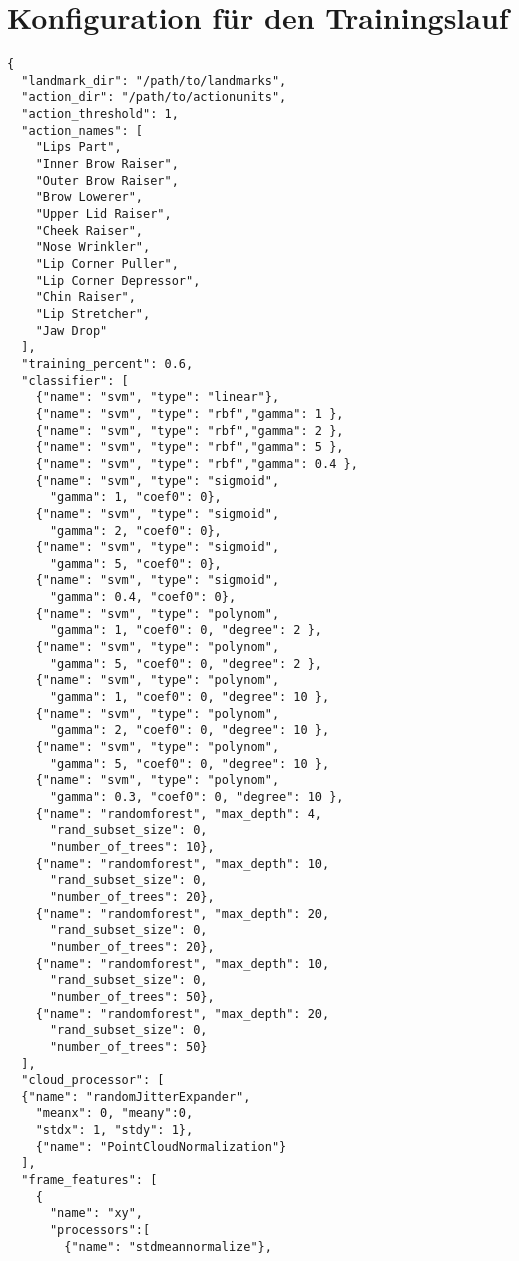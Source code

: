 \section{Konfiguration für den Trainingslauf}\label{Anhang.config}
\begin{multicols}{2}
\begin{verbatim}
{
  "landmark_dir": "/path/to/landmarks",
  "action_dir": "/path/to/actionunits",
  "action_threshold": 1,
  "action_names": [
    "Lips Part",
    "Inner Brow Raiser",
    "Outer Brow Raiser",
    "Brow Lowerer",
    "Upper Lid Raiser",
    "Cheek Raiser",
    "Nose Wrinkler",
    "Lip Corner Puller",
    "Lip Corner Depressor",
    "Chin Raiser",
    "Lip Stretcher",
    "Jaw Drop"
  ],
  "training_percent": 0.6,
  "classifier": [
    {"name": "svm", "type": "linear"},
    {"name": "svm", "type": "rbf","gamma": 1 },
    {"name": "svm", "type": "rbf","gamma": 2 },
    {"name": "svm", "type": "rbf","gamma": 5 },
    {"name": "svm", "type": "rbf","gamma": 0.4 },
    {"name": "svm", "type": "sigmoid",
      "gamma": 1, "coef0": 0},
    {"name": "svm", "type": "sigmoid",
      "gamma": 2, "coef0": 0},
    {"name": "svm", "type": "sigmoid",
      "gamma": 5, "coef0": 0},
    {"name": "svm", "type": "sigmoid",
      "gamma": 0.4, "coef0": 0},
    {"name": "svm", "type": "polynom",
      "gamma": 1, "coef0": 0, "degree": 2 },
    {"name": "svm", "type": "polynom",
      "gamma": 5, "coef0": 0, "degree": 2 },
    {"name": "svm", "type": "polynom",
      "gamma": 1, "coef0": 0, "degree": 10 },
    {"name": "svm", "type": "polynom",
      "gamma": 2, "coef0": 0, "degree": 10 },
    {"name": "svm", "type": "polynom",
      "gamma": 5, "coef0": 0, "degree": 10 },
    {"name": "svm", "type": "polynom",
      "gamma": 0.3, "coef0": 0, "degree": 10 },
    {"name": "randomforest", "max_depth": 4,
      "rand_subset_size": 0,
      "number_of_trees": 10},
    {"name": "randomforest", "max_depth": 10,
      "rand_subset_size": 0,
      "number_of_trees": 20},
    {"name": "randomforest", "max_depth": 20,
      "rand_subset_size": 0,
      "number_of_trees": 20},
    {"name": "randomforest", "max_depth": 10,
      "rand_subset_size": 0,
      "number_of_trees": 50},
    {"name": "randomforest", "max_depth": 20,
      "rand_subset_size": 0,
      "number_of_trees": 50}
  ],
  "cloud_processor": [
  {"name": "randomJitterExpander",
    "meanx": 0, "meany":0,
    "stdx": 1, "stdy": 1},
    {"name": "PointCloudNormalization"}
  ],
  "frame_features": [
    {
      "name": "xy",
      "processors":[
        {"name": "stdmeannormalize"},

\end{verbatim}
\end{multicols}
